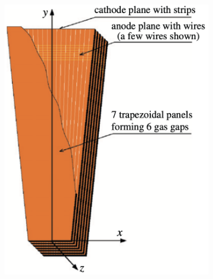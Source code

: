 \begin{figure}[ht]
	\centering
	\begin{subfigure}[b]{0.475\textwidth}
		\centering
		\includegraphics[width=\textwidth]{MSc_Thesis/fig/csc1.png}
		\vspace{-0.75cm}
		\label{csc1}
	\end{subfigure}
	\hspace{0.2cm}
	\begin{subfigure}[b]{0.475\textwidth}  
		\centering 

\end{subfigure}
\end{figure}
